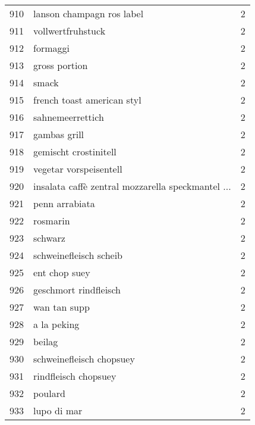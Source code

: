 \begin{tabular}{llr}
910  &                          lanson champagn ros label &      2 \\
911  &                                  vollwertfruhstuck &      2 \\
912  &                                           formaggi &      2 \\
913  &                                      gross portion &      2 \\
914  &                                              smack &      2 \\
915  &                         french toast american styl &      2 \\
916  &                                   sahnemeerrettich &      2 \\
917  &                                       gambas grill &      2 \\
918  &                              gemischt crostinitell &      2 \\
919  &                             vegetar vorspeisentell &      2 \\
920  &  insalata caffè zentral mozzarella speckmantel ... &      2 \\
921  &                                     penn arrabiata &      2 \\
922  &                                           rosmarin &      2 \\
923  &                                            schwarz &      2 \\
924  &                             schweinefleisch scheib &      2 \\
925  &                                      ent chop suey &      2 \\
926  &                              geschmort rindfleisch &      2 \\
927  &                                       wan tan supp &      2 \\
928  &                                        a la peking &      2 \\
929  &                                             beilag &      2 \\
930  &                           schweinefleisch chopsuey &      2 \\
931  &                               rindfleisch chopsuey &      2 \\
932  &                                            poulard &      2 \\
933  &                                        lupo di mar &      2 \\

\end{tabular}
